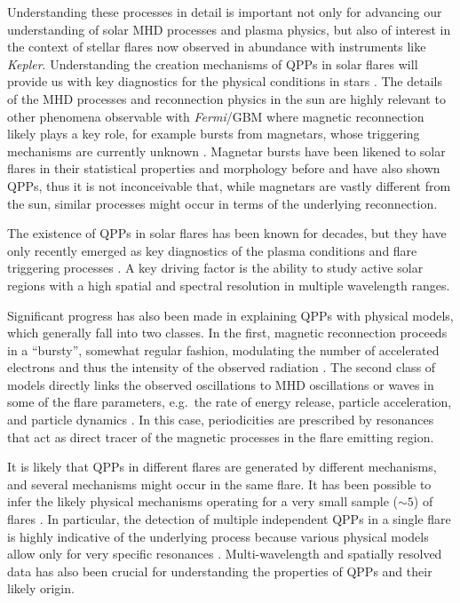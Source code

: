 \documentclass{aastex61}
\newcommand{\fermi}{\mbox{\textit{Fermi}}}
\begin{document}
Understanding these processes in detail is important not only for advancing our understanding of solar MHD processes and plasma physics, but also of interest in the context of stellar flares now observed in abundance with instruments like \textit{Kepler}. 
Understanding the creation mechanisms of QPPs in solar flares will provide us with key diagnostics for the physical conditions in stars \citep[e.g.][]{kowalski2010}.
The details of the MHD processes and reconnection physics in the sun are highly relevant to other phenomena observable with \fermi/GBM where magnetic reconnection likely plays a key role, for example bursts from magnetars, whose triggering mechanisms are currently unknown  \citep{turolla2015}. 
Magnetar bursts have been likened to solar flares in their statistical properties and morphology before \citep{prieskorn2012} and have also shown QPPs\citep{huppenkothen2014}, thus it is not inconceivable that, while magnetars are vastly different from the sun, similar processes might occur in terms of the underlying reconnection.

The existence of QPPs in solar flares has been known for decades, but they have only recently emerged as key diagnostics of the plasma conditions and flare triggering processes \citep[e.g.][ and references therein]{nakariakov2009}. 
A key driving factor is the ability to study active solar regions with a high spatial and spectral resolution in multiple wavelength ranges. 

Significant progress has also been made in explaining QPPs with physical models, which generally fall into two classes.
In the first, magnetic reconnection proceeds in a ``bursty'', somewhat regular fashion, modulating the number of accelerated electrons and thus the intensity of the observed radiation \citep{kliem2000,ofman2006,murray2009}. 
The second class of models directly links the observed oscillations to MHD oscillations or waves in some of the flare parameters, e.g.\ the rate of energy release, particle acceleration, and particle dynamics \citep{nakariakov2007,pascoe2007}. 
In this case, periodicities are prescribed by resonances that act as direct tracer of the magnetic processes in the flare emitting region.

It is likely that QPPs in different flares are generated by different mechanisms, and several mechanisms might occur in the same flare.
It has been possible to infer the likely physical mechanisms operating for a very small sample ($\sim 5$) of flares \citep{asai2001,melnikov2005,inglis2008}. In particular, the detection of multiple independent QPPs in a single flare is highly indicative of the underlying process because various physical models allow only for very specific resonances \citep{melnikov2005,inglis2009}. 
Multi-wavelength and spatially resolved data has also been crucial for understanding the properties of QPPs and their likely origin. 
\end{document}
